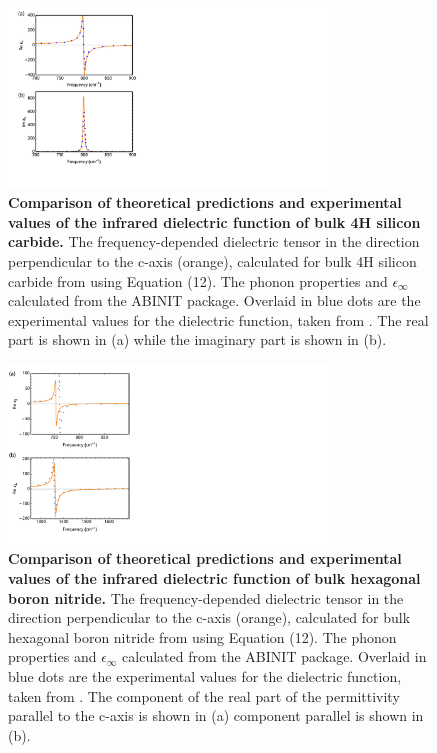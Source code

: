 \documentclass[aps,prb,twocolumn,
	groupedaddress,superscriptaddress,
	amsfonts,amssymb,amsmath,floatfix,
	citeautoscript]{revtex4-1}
\begin{document}
\begin{figure}[t]
\includegraphics[width=8.5cm]{SiC_comparison_thy_vs_expt.pdf}
\caption{\textbf{Comparison of theoretical predictions and experimental values of the infrared dielectric function of bulk 4H silicon carbide.} The frequency-depended dielectric tensor in the direction perpendicular to the c-axis (orange), calculated for bulk 4H silicon carbide from using Equation (12). The phonon properties and $\epsilon_{\infty}$ calculated from the ABINIT package. Overlaid in blue dots are the experimental values for the dielectric function, taken from \cite{tiwald1999carrier}. The real part is shown in (a) while the imaginary part is shown in (b). }
\label{fig:epsilon}
\end{figure}

\begin{figure}[t]
\includegraphics[width=8.5cm]{hBN_comparison_thy_vs_expt.pdf}
\caption{\textbf{Comparison of theoretical predictions and experimental values of the infrared dielectric function of bulk hexagonal boron nitride.} The frequency-depended dielectric tensor in the direction perpendicular to the c-axis (orange), calculated for bulk hexagonal boron nitride from using Equation (12). The phonon properties and $\epsilon_{\infty}$ calculated from the ABINIT package. Overlaid in blue dots are the experimental values for the dielectric function, taken from \cite{caldwell2014sub}. The component of the real part of the permittivity parallel to the c-axis is shown in (a) component parallel is shown in (b).}
\label{fig:phonons}
\end{figure}
\end{document}

